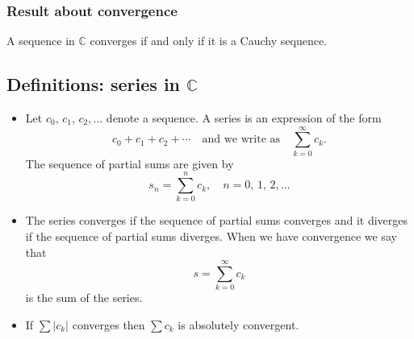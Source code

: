 \documentclass{article}
\begin{document}
\subsubsection{Result about convergence}
A sequence in $\mathbb{C}$ converges if and only if it is a Cauchy sequence.


\subsection{Definitions: series in $\mathbb{C}$}
\begin{itemize}
    \item Let $c_0,\,c_1,\,c_2,\ldots$ denote a sequence. A series is an expression of the form
    \begin{equation}
        c_0 + c_1 + c_2 + \cdots\quad \text{and we write as}\quad \sum_{k=0}^\infty c_k.
    \end{equation}
    The sequence of partial sums are given by
    \begin{equation}
        s_n = \sum_{k=0}^n c_k,\quad n = 0,\,1,\,2,\ldots
    \end{equation}
    \item The series converges if the sequence of partial sums converges and it diverges if the sequence of partial sums diverges. When we have convergence we say that
    \begin{equation}
        s = \sum_{k=0}^\infty c_k
    \end{equation}
    is the sum of the series.
    \item If $\sum \vert c_k\vert$ converges then $\sum c_k$ is absolutely convergent.
\end{itemize}
\end{document}
